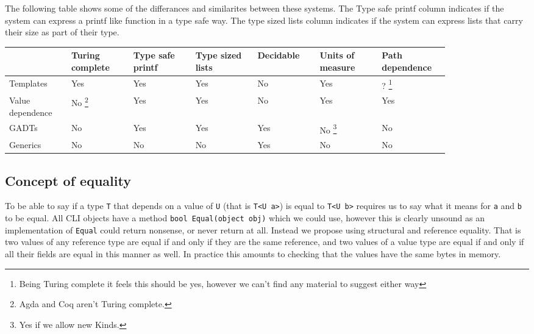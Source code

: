 \documentclass[english]{report}
\begin{document}
The following table shows some of the differances and similarites
between these systems. The Type safe printf column indicates if the
system can express a printf like function in a type safe way. The
type sized lists column indicates if the system can express lists
that carry their size as part of their type.

\begin{center}
\begin{longtable}{|>{\centering}p{0.12\linewidth}|>{\centering}p{0.12\linewidth}|>{\centering}p{0.12\linewidth}|>{\centering}p{0.12\linewidth}|>{\centering}p{0.12\linewidth}|>{\centering}p{0.12\linewidth}|>{\centering}p{0.12\linewidth}|}
\cline{2-7} 
\multicolumn{1}{>{\centering}p{0.12\linewidth}|}{} & Turing complete & Type safe printf & Type sized lists & Decidable & Units of measure & Path dependence\tabularnewline
\hline 
Templates & Yes & Yes & Yes & No & Yes & ?%
\footnote{Being Turing complete it feels this should be yes, however we can't
find any material to suggest either way%
}\tabularnewline
\hline 
Value dependence & No%
\footnote{Agda and Coq aren't Turing complete.%
} & Yes & Yes & No & Yes & Yes\tabularnewline
\hline 
GADTs & No & Yes & Yes & Yes & No%
\footnote{Yes if we allow new Kinds\cite{gadtsext}.%
} & No\tabularnewline
\hline 
Generics & No & No & No & Yes & No & No\tabularnewline
\hline 
\end{longtable}
\par\end{center}


\subsection{Concept of equality}

To be able to say if a type \texttt{T} that depends on a value of
\texttt{U} (that is \texttt{T<U a>}) is equal to \texttt{T<U b>} requires
us to say what it means for \texttt{a} and \texttt{b} to be equal.
All CLI objects have a method \texttt{bool Equal(object obj)} which
we could use, however this is clearly unsound as an implementation
of \texttt{Equal} could return nonsense, or never return at all. %
Instead we propose using structural and reference equality. That is
two values of any reference type are equal if and only if they are
the same reference, and two values of a value type are equal if and
only if all their fields are equal in this manner as well. In practice
this amounts to checking that the values have the same bytes in memory.
\end{document}

